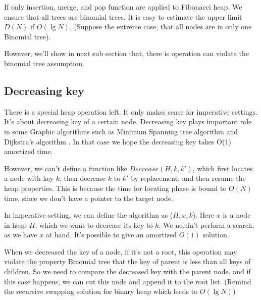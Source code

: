 \documentclass{article}
\begin{document}
If only insertion, merge, and pop function are applied to Fibonacci
heap. We ensure that all trees are binomial trees. It is easy to 
estimate the upper limit $D(N)$ if $O(\lg N)$. (Suppose the extreme
case, that all nodes are in only one Binomial tree). 

However, we'll show in next sub section that, there is operation can
violate the binomial tree assumption.

\subsection{Decreasing key}
There is a special
heap operation left. It only makes sense for imperative settings.
It's about decreasing key of a certain node. Decreasing key plays
important role in some Graphic algorithms such as Minimum Spanning
tree algorithm and Dijkstra's algorithm \cite{CLRS}. In that case
we hope the decreasing key takes O(1) amortized time.

However, we can't define a function like $Decrease(H, k, k')$, which
first locates a node with key $k$, then decrease $k$ to $k'$ by replacement,
and then resume the heap properties. This is because the time for 
locating phase is bound to $O(N)$ time, since we don't have a pointer
to the target node. 

In imperative setting, we can define the algorithm as 
($H, x, k$). Here $x$ is a node in heap $H$, which
we want to decrease its key to $k$. We needn't perform a search, as
we have $x$ at hand. It's possible to give an amortized $O(1)$ solution.

When we decreased the key of a node, if it's not a root, this operation
may violate the property Binomial tree that the key of parent is
less than all keys of children. So we need to compare the decreased key
with the parent node, and if this case happens, we can cut this node
and append it to the root list. (Remind the recursive swapping solution
for binary heap which leads to $O(\lg N)$)

\end{document}
